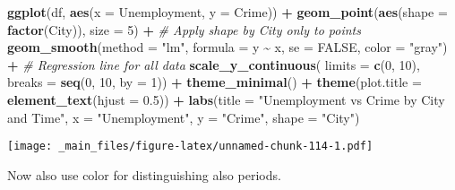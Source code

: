 \documentclass[
]{book}
\newenvironment{Shaded}{\begin{snugshade}}{\end{snugshade}}
\newcommand{\AttributeTok}[1]{\textcolor[rgb]{0.13,0.29,0.53}{#1}}
\newcommand{\CommentTok}[1]{\textcolor[rgb]{0.56,0.35,0.01}{\textit{#1}}}
\newcommand{\ConstantTok}[1]{\textcolor[rgb]{0.56,0.35,0.01}{#1}}
\newcommand{\DecValTok}[1]{\textcolor[rgb]{0.00,0.00,0.81}{#1}}
\newcommand{\FloatTok}[1]{\textcolor[rgb]{0.00,0.00,0.81}{#1}}
\newcommand{\FunctionTok}[1]{\textcolor[rgb]{0.13,0.29,0.53}{\textbf{#1}}}
\newcommand{\NormalTok}[1]{#1}
\newcommand{\SpecialCharTok}[1]{\textcolor[rgb]{0.81,0.36,0.00}{\textbf{#1}}}
\newcommand{\StringTok}[1]{\textcolor[rgb]{0.31,0.60,0.02}{#1}}
\begin{document}
\begin{Shaded}
\begin{Highlighting}[]
\FunctionTok{ggplot}\NormalTok{(df, }\FunctionTok{aes}\NormalTok{(}\AttributeTok{x =}\NormalTok{ Unemployment, }\AttributeTok{y =}\NormalTok{ Crime)) }\SpecialCharTok{+}
  \FunctionTok{geom\_point}\NormalTok{(}\FunctionTok{aes}\NormalTok{(}\AttributeTok{shape =} \FunctionTok{factor}\NormalTok{(City)), }\AttributeTok{size =} \DecValTok{5}\NormalTok{) }\SpecialCharTok{+}  \CommentTok{\# Apply shape by City only to points}
  \FunctionTok{geom\_smooth}\NormalTok{(}\AttributeTok{method =} \StringTok{"lm"}\NormalTok{, }\AttributeTok{formula =}\NormalTok{ y }\SpecialCharTok{\textasciitilde{}}\NormalTok{ x, }\AttributeTok{se =} \ConstantTok{FALSE}\NormalTok{, }\AttributeTok{color =} \StringTok{"gray"}\NormalTok{) }\SpecialCharTok{+}  \CommentTok{\# Regression line for all data}
  \FunctionTok{scale\_y\_continuous}\NormalTok{(}
    \AttributeTok{limits =} \FunctionTok{c}\NormalTok{(}\DecValTok{0}\NormalTok{, }\DecValTok{10}\NormalTok{),}
    \AttributeTok{breaks =} \FunctionTok{seq}\NormalTok{(}\DecValTok{0}\NormalTok{, }\DecValTok{10}\NormalTok{, }\AttributeTok{by =} \DecValTok{1}\NormalTok{)) }\SpecialCharTok{+}
  \FunctionTok{theme\_minimal}\NormalTok{() }\SpecialCharTok{+}
  \FunctionTok{theme}\NormalTok{(}\AttributeTok{plot.title =} \FunctionTok{element\_text}\NormalTok{(}\AttributeTok{hjust =} \FloatTok{0.5}\NormalTok{)) }\SpecialCharTok{+}
  \FunctionTok{labs}\NormalTok{(}\AttributeTok{title =} \StringTok{"Unemployment vs Crime by City and Time"}\NormalTok{,}
       \AttributeTok{x =} \StringTok{"Unemployment"}\NormalTok{,}
       \AttributeTok{y =} \StringTok{"Crime"}\NormalTok{,}
       \AttributeTok{shape =} \StringTok{"City"}\NormalTok{)}
\end{Highlighting}
\end{Shaded}

\texttt{[image: \_main\_files/figure-latex/unnamed-chunk-114-1.pdf]}

Now also use color for distinguishing also periods.
\end{document}
